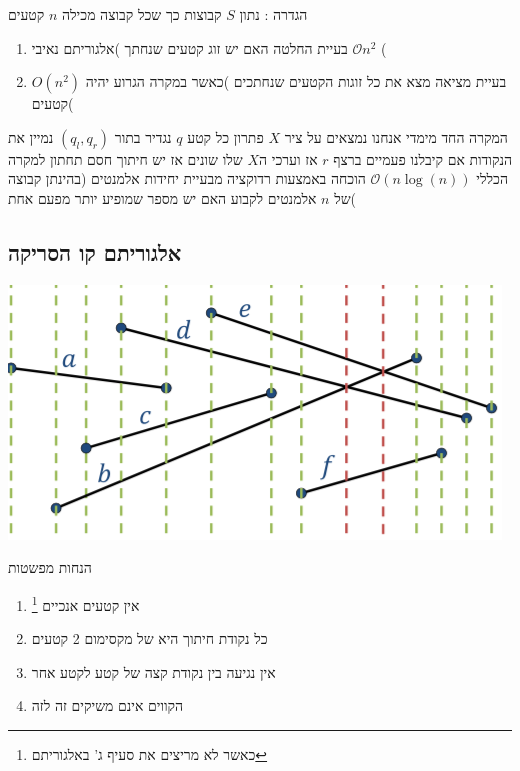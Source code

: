 \documentclass{article}
\makeatletter
\newcommand*{\saved@uline}{}
\let\saved@uline\uline
\newcommand*{\mathuline}{%
  \mathpalette{\math@uline\saved@uline}%
}
\newcommand*{\math@uline}[3]{%
  \mbox{#1{$#2#3\m@th$}}%
}
\renewcommand*{\uline}{%
  \relax  
  \ifmmode
    \expandafter\mathuline
  \else
    \expandafter\saved@uline
  \fi
}
\makeatother
\begin{document}
הגדרה : נתון $S$ קבוצות כך שכל קבוצה מכילה $n$ קטעים 
\begin{enumerate}
\item \uline{בעיית החלטה} האם יש זוג קטעים שנחתך )אלגוריתם נאיבי $\mathcal{O}{n^2}$ (
\item \uline{בעיית מציאה} מצא את כל זוגות הקטעים שנחתכים )כאשר במקרה הגרוע יהיה $O(n^2)$ קטעים(
\end{enumerate}
\noindent\uline{המקרה החד מימדי} אנחנו נמצאים על ציר $X$
\newline\uline{פתרון} כל קטע $q$ נגדיר בתור $(q_l,q_r)$ נמיין את הנקודות אם קיבלנו פעמיים ברצף $r$ אז וערכי ה$X$ שלו שונים אז יש חיתוך
\newline\uline{חסם תחתון למקרה הכללי} $\mathcal{O}(n\log(n))$ הוכחה באמצעות רדוקציה מבעיית יחידות אלמנטים (בהינתן קבוצה של $n$ אלמנטים לקבוע האם יש מספר שמופיע יותר מפעם אחת(
\subsection{אלגוריתם קו הסריקה}
\includegraphics[scale=0.75]{z9.png}

\uline{הנחות מפשטות}
\begin{enumerate}
\item אין קטעים אנכיים \footnote{כאשר לא מריצים את סעיף ג' באלגוריתם}
\item כל נקודת חיתוך היא של מקסימום 2 קטעים
\item אין נגיעה בין נקודת קצה של קטע לקטע אחר
\item הקווים אינם משיקים זה לזה
\end{enumerate}
\end{document}
